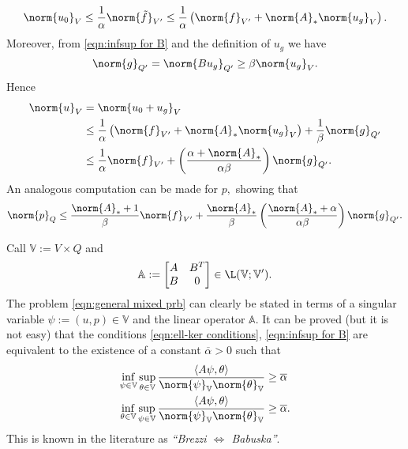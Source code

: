 \begin{equation*}
    \norm{u_0}_V\leq\frac{1}{\alpha}\norm{\Tilde{f}}_{V'}\leq\frac{1}{\alpha}\left( 
\norm{f}_{V'}+\norm{A}_*\norm{u_g}_V \right).
\end{equation*}
Moreover, from \eqref{eqn:infsup for B} and the definition of $u_g$ we have
\begin{equation*}
    \norm{g}_{Q'}=\norm{Bu_g}_{Q'}\geq\beta\norm{u_g}_V.
\end{equation*}
Hence 
\begin{align*}
    \norm{u}_V &= \norm{u_0+u_g}_V\\
    &\leq\frac{1}{\alpha}\left(\norm{f}_{V'}+\norm{A}_*\norm{u_g}_V \right)+\frac{1}{\beta}\norm{g}_{Q'}\\
    &\leq \frac{1}{\alpha}\norm{f}_{V'}+\left( \frac{\alpha+\norm{A}_*}{\alpha\beta}\right)\norm{g}_{Q'}.
\end{align*}
An analogous computation can be made for $p,$ showing that
\begin{equation*}
    \norm{p}_Q\leq\frac{\norm{A}_*+1}{\beta}\norm{f}_{V'}+\frac{\norm{A}_*}{\beta}\left(\frac{\norm{A}_*+\alpha}{\alpha\beta}\right)\norm{g}_{Q'}.
\end{equation*}
\begin{remark}
    Call $\mathbb{V}:=V\times Q$ and
    \begin{equation*}
        \mathbb{A}:=\begin{bmatrix}
            A & B^T\\
            B & 0
        \end{bmatrix}\in\L(\mathbb{V};\mathbb{V}').
    \end{equation*}
    The problem \eqref{eqn:general mixed prb} can clearly be stated in terms of a singular variable $\psi:=(u,p)\in\mathbb{V}$ and the linear operator $\mathbb{A}$. It can be proved (but it is not easy) that the conditions \eqref{eqn:ell-ker conditions}, \eqref{eqn:infsup for B} are equivalent to the existence of a constant $\overline{\alpha}>0$ such that
    \begin{align}
        \inf_{\psi\in \mathbb{V}}\sup_{\theta\in \mathbb{V}}\frac{\langle A\psi,\theta \rangle}{\norm{\psi}_\mathbb{V}\norm{\theta}_\mathbb{V}}&\geq\overline{\alpha} \\
        \inf_{\theta\in \mathbb{V}}\sup_{\psi\in \mathbb{V}}\frac{\langle A\psi,\theta \rangle}{\norm{\psi}_\mathbb{V}\norm{\theta}_\mathbb{V}}&\geq\overline{\alpha}.
    \end{align}
    This is known in the literature as \emph{``Brezzi $\iff$ Babuska''}.
\end{remark}

